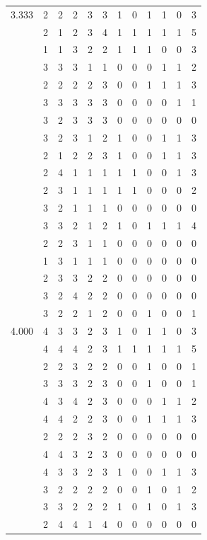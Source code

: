 \documentclass[]{msu-thesis}
\theoremstyle{definition}
\theoremstyle{definition}
\theoremstyle{definition}
\theoremstyle{remark}
\begin{document}
\begin{table}
{\begin{tabular}[t]{rrrrrrrrrrrr}
3.333 & 2 & 2 & 2 & 3 & 3 & 1 & 0 & 1 & 1 & 0 & 3\\
 & 2 & 1 & 2 & 3 & 4 & 1 & 1 & 1 & 1 & 1 & 5\\
 & 1 & 1 & 3 & 2 & 2 & 1 & 1 & 1 & 0 & 0 & 3\\
 & 3 & 3 & 3 & 1 & 1 & 0 & 0 & 0 & 1 & 1 & 2\\
 & 2 & 2 & 2 & 2 & 3 & 0 & 0 & 1 & 1 & 1 & 3\\
 & 3 & 3 & 3 & 3 & 3 & 0 & 0 & 0 & 0 & 1 & 1\\
 & 3 & 2 & 3 & 3 & 3 & 0 & 0 & 0 & 0 & 0 & 0\\
 & 3 & 2 & 3 & 1 & 2 & 1 & 0 & 0 & 1 & 1 & 3\\
 & 2 & 1 & 2 & 2 & 3 & 1 & 0 & 0 & 1 & 1 & 3\\
 & 2 & 4 & 1 & 1 & 1 & 1 & 1 & 0 & 0 & 1 & 3\\
 & 2 & 3 & 1 & 1 & 1 & 1 & 1 & 0 & 0 & 0 & 2\\
 & 3 & 2 & 1 & 1 & 1 & 0 & 0 & 0 & 0 & 0 & 0\\
 & 3 & 3 & 2 & 1 & 2 & 1 & 0 & 1 & 1 & 1 & 4\\
 & 2 & 2 & 3 & 1 & 1 & 0 & 0 & 0 & 0 & 0 & 0\\
 & 1 & 3 & 1 & 1 & 1 & 0 & 0 & 0 & 0 & 0 & 0\\
 & 2 & 3 & 3 & 2 & 2 & 0 & 0 & 0 & 0 & 0 & 0\\
 & 3 & 2 & 4 & 2 & 2 & 0 & 0 & 0 & 0 & 0 & 0\\
 & 3 & 2 & 2 & 1 & 2 & 0 & 0 & 1 & 0 & 0 & 1\\
4.000 & 4 & 3 & 3 & 2 & 3 & 1 & 0 & 1 & 1 & 0 & 3\\
 & 4 & 4 & 4 & 2 & 3 & 1 & 1 & 1 & 1 & 1 & 5\\
 & 2 & 2 & 3 & 2 & 2 & 0 & 0 & 1 & 0 & 0 & 1\\
 & 3 & 3 & 3 & 2 & 3 & 0 & 0 & 1 & 0 & 0 & 1\\
 & 4 & 3 & 4 & 2 & 3 & 0 & 0 & 0 & 1 & 1 & 2\\
 & 4 & 4 & 2 & 2 & 3 & 0 & 0 & 1 & 1 & 1 & 3\\
 & 2 & 2 & 2 & 3 & 2 & 0 & 0 & 0 & 0 & 0 & 0\\
 & 4 & 4 & 3 & 2 & 3 & 0 & 0 & 0 & 0 & 0 & 0\\
 & 4 & 3 & 3 & 2 & 3 & 1 & 0 & 0 & 1 & 1 & 3\\
 & 3 & 2 & 2 & 2 & 2 & 0 & 0 & 1 & 0 & 1 & 2\\
 & 3 & 3 & 2 & 2 & 2 & 1 & 0 & 1 & 0 & 1 & 3\\
 & 2 & 4 & 4 & 1 & 4 & 0 & 0 & 0 & 0 & 0 & 0\\

\end{tabular}}
\end{table}
\end{document}

